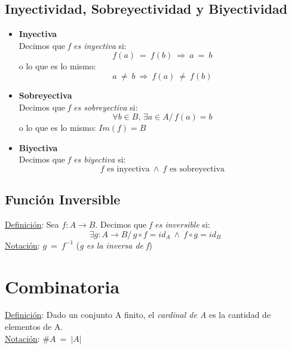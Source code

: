 \documentclass{article}
\newcommand{\lands}{\:\land\:}                          %
\newcommand{\comma}{,\,}                                %
\newcommand{\tq}{/\,}                                   %
\newcommand{\eq}{\:=\:}                                 %
\newcommand{\neqs}{\:\neq\:}                            %
\newcommand{\Rightarrows}{\: \Rightarrow \:}            %
\begin{document}
\subsection{Inyectividad, Sobreyectividad y Biyectividad}
\begin{itemize}
    \item \textbf{Inyectiva}
    \\Decimos que \emph{f es inyectiva} si:
    \begin{equation*}
        f(a) \eq f(b) \Rightarrows a \eq b
    \end{equation*}
    o lo que es lo mismo:
    \begin{equation*}
        a \neqs b \Rightarrows f(a) \neqs f(b)
    \end{equation*}
    \item \textbf{Sobreyectiva}
    \\Decimos que \emph{f  es sobreyectiva} si:
    \begin{equation*}
        \forall b \in B \comma \exists a \in A \tq f(a)=b
    \end{equation*}
    o lo que es lo mismo: $Im(f)=B$
    \item \textbf{Biyectiva}
    \\Decimos que \emph{f es biyectiva} si:
    \begin{equation*}
       f \text{ es inyectiva} \lands f \text{ es sobreyectiva}
    \end{equation*}
\end{itemize}
\subsection*{Función Inversible}
\underline{Definición}: Sea $f: A \rightarrow B$. Decimos que \emph{f es inversible} si: 
\begin{equation*}
\exists g: A \rightarrow B \tq g\circ f = id_A \lands f\circ g = id_B
\end{equation*}
\underline{Notación}: $g \eq f^{-1}$ (\emph{g es la inversa de f})
\pagebreak

\section{Combinatoria}
\underline{Definición}: Dado un conjunto A finito, el \emph{cardinal de A} es la cantidad de \linebreak elementos de A.
\\ \underline{Notación}: $\#A \eq |A|$
\end{document}
